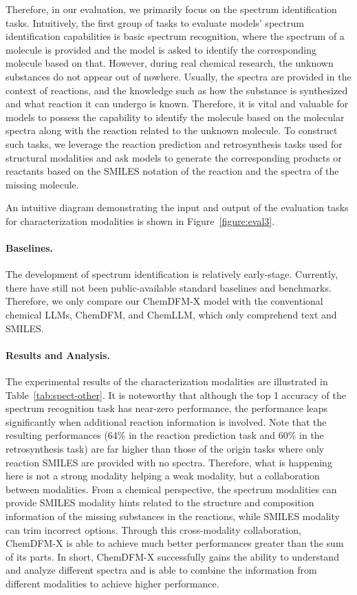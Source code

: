 Therefore, in our evaluation, we primarily focus on the spectrum identification tasks. Intuitively, the first group of tasks to evaluate models' spectrum identification capabilities is basic spectrum recognition, where the spectrum of a molecule is provided and the model is asked to identify the corresponding molecule based on that. However, during real chemical research, the unknown substances do not appear out of nowhere. Usually, the spectra are provided in the context of reactions, and the knowledge such as how the substance is synthesized and what reaction it can undergo is known. Therefore, it is vital and valuable for models to possess the capability to identify the molecule based on the molecular spectra along with the reaction related to the unknown molecule. To construct such tasks, we leverage the reaction prediction and retrosynthesis tasks used for structural modalities and ask models to generate the corresponding products or reactants based on the SMILES notation of the reaction and the spectra of the missing molecule.

An intuitive diagram demonstrating the input and output of the evaluation tasks for characterization modalities is shown in Figure~\ref{figure:eval3}.

\paragraph{Baselines.} The development of spectrum identification is relatively early-stage. Currently, there have still not been public-available standard baselines and benchmarks. Therefore, we only compare our ChemDFM-X model with the conventional chemical LLMs, ChemDFM, and ChemLLM, which only comprehend text and SMILES.

\paragraph{Results and Analysis.}The experimental results of the characterization modalities are illustrated in Table~\ref{tab:spect-other}. 
It is noteworthy that although the top 1 accuracy of the spectrum recognition task has near-zero performance, the performance leaps significantly when additional reaction information is involved. Note that the resulting performances (64\% in the reaction prediction task and 60\% in the retrosynthesis task) are far higher than those of the origin tasks where only reaction SMILES are provided with no spectra. Therefore, what is happening here is not a strong modality helping a weak modality, but a collaboration between modalities. From a chemical perspective, the spectrum modalities can provide SMILES modality hints related to the structure and composition information of the missing substances in the reactions, while SMILES modality can trim incorrect options. Through this cross-modality collaboration, ChemDFM-X is able to achieve much better performances greater than the sum of its parts. In short, ChemDFM-X successfully gains the ability to understand and analyze different spectra and is able to combine the information from different modalities to achieve higher performance.

